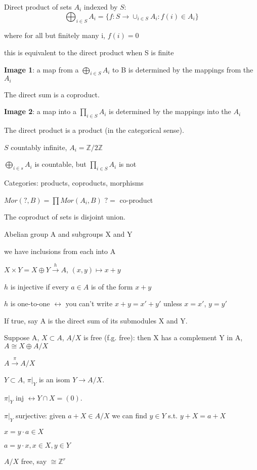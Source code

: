 \documentclass[12pt]{article}
\begin{document}
\noindent
Direct product of sets $A_i$ indexed by $S$: $$\bigoplus_{i \in S}A_i = \{f: S \to \cup_{i \in S}A_i : f(i) \in A_i\}$$

where for all but finitely many i, $f(i) = 0$

this is equivalent to the direct product when S is finite

\noindent
\textbf{Image 1}: a map from a $\bigoplus_{i \in S}A_i$ to B is determined by the mappings from the $A_i$

The direct sum is a coproduct.

\noindent
\textbf{Image 2}: a map into a $\prod_{i \in S}A_i$ is determined by the mappings into the $A_i$

The direct product is a product (in the categorical sense).

\noindent
$S$ countably infinite, $A_i = \mathds{Z}/2\mathds{Z}$

$\bigoplus_{i \in s}A_i$ is countable, but $\prod_{i \in S}A_i$ is not

\noindent
Categories: products, coproducts, morphisms

$Mor(?, B) = \prod Mor(A_i, B)$ $? =$ co-product

The coproduct of sets is disjoint union.

\noindent
Abelian group A and subgroups X and Y

we have inclusions from each into A

$X \times Y = X \oplus Y \xrightarrow{h} A$, $(x, y) \mapsto x + y$

$h$ is injective if every $a \in A$ is of the form $x + y$

$h$ is one-to-one $\leftrightarrow$ you can't write $x + y = x' + y'$ unless $x = x'$, $y = y'$

If true, say A is the direct sum of its submodules X and Y.

\noindent
Suppose A, $X \subset A$, $A/X$ is free (f.g. free): then X has a complement Y in A, $A \cong X \oplus A/X$

$A \xrightarrow{\pi} A/X$

$Y \subset A$, $\pi|_Y$ is an isom $Y \to A/X$.

$\pi|_Y$ inj $\leftrightarrow Y \cap X = (0).$

$\pi|_Y$ surjective: given $a + X \in A/X$ we can find $y \in Y$ s.t. $y + X = a + X$

$x = y \cdot a \in X$

$a = y \cdot x, x\in X, y\in Y$

$A/X$ free, say $\cong \mathds{Z}^r$
\end{document}
